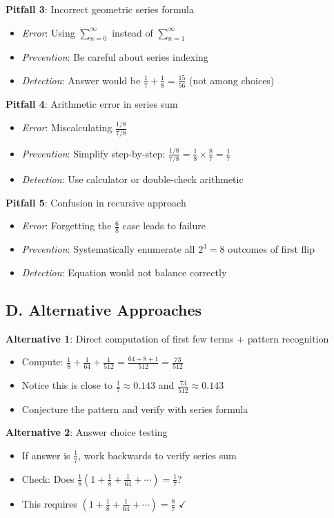 \documentclass[11pt]{article}
\begin{document}
\begin{roadmapbox}
\textbf{Pitfall 3}: Incorrect geometric series formula
\begin{itemize}
    \item \textit{Error}: Using $\sum_{n=0}^{\infty}$ instead of $\sum_{n=1}^{\infty}$
    \item \textit{Prevention}: Be careful about series indexing
    \item \textit{Detection}: Answer would be $\frac{1}{7} + \frac{1}{8} = \frac{15}{56}$ (not among choices)
\end{itemize}

\textbf{Pitfall 4}: Arithmetic error in series sum
\begin{itemize}
    \item \textit{Error}: Miscalculating $\frac{1/8}{7/8}$
    \item \textit{Prevention}: Simplify step-by-step: $\frac{1/8}{7/8} = \frac{1}{8} \times \frac{8}{7} = \frac{1}{7}$
    \item \textit{Detection}: Use calculator or double-check arithmetic
\end{itemize}

\textbf{Pitfall 5}: Confusion in recursive approach
\begin{itemize}
    \item \textit{Error}: Forgetting the $\frac{6}{8}$ case leads to failure
    \item \textit{Prevention}: Systematically enumerate all $2^3 = 8$ outcomes of first flip
    \item \textit{Detection}: Equation would not balance correctly
\end{itemize}

\subsection*{D. Alternative Approaches}

\textbf{Alternative 1}: Direct computation of first few terms + pattern recognition
\begin{itemize}
    \item Compute: $\frac{1}{8} + \frac{1}{64} + \frac{1}{512} = \frac{64 + 8 + 1}{512} = \frac{73}{512}$
    \item Notice this is close to $\frac{1}{7} \approx 0.143$ and $\frac{73}{512} \approx 0.143$
    \item Conjecture the pattern and verify with series formula
\end{itemize}

\textbf{Alternative 2}: Answer choice testing
\begin{itemize}
    \item If answer is $\frac{1}{7}$, work backwards to verify series sum
    \item Check: Does $\frac{1}{8}(1 + \frac{1}{8} + \frac{1}{64} + \cdots) = \frac{1}{7}$?
    \item This requires $(1 + \frac{1}{8} + \frac{1}{64} + \cdots) = \frac{8}{7}$ $\checkmark$
\end{itemize}
\end{roadmapbox}
\end{document}
